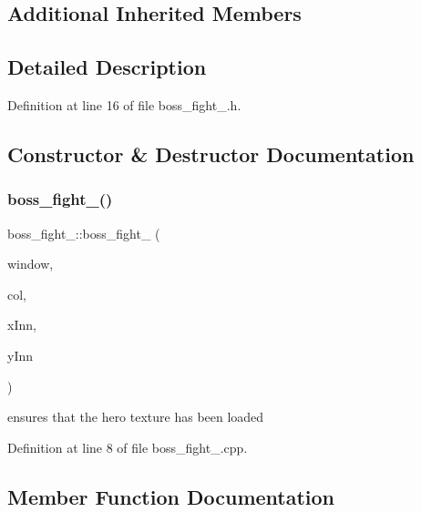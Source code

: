 \subsection*{Additional Inherited Members}


\subsection{Detailed Description}


Definition at line 16 of file boss\+\_\+fight\+\_.\+h.



\subsection{Constructor \& Destructor Documentation}
\hypertarget{classboss__fight__3_acce476f4d093dcf8266d554d5b574edf}{}\label{classboss__fight__3_acce476f4d093dcf8266d554d5b574edf} 
\subsubsection{\texorpdfstring{boss\+\_\+fight\+\_()}{boss\_fight\_3()}}
{\footnotesize\ttfamily boss\+\_\+fight\+\_\+::boss\+\_\+fight\+\_ (\begin{DoxyParamCaption}\item[{sf\+::\+Render\+Window \&}]{window,  }\item[{\hyperlink{class_collision}{Collision}}]{col,  }\item[{int}]{x\+Inn,  }\item[{int}]{y\+Inn }\end{DoxyParamCaption})}

ensures that the hero texture has been loaded 

Definition at line 8 of file boss\+\_\+fight\+\_.\+cpp.



\subsection{Member Function Documentation}
\hypertarget{classboss__fight__3_adfe8a4ff5e97513348411aa89a91e68c}{}\label{classboss__fight__3_adfe8a4ff5e97513348411aa89a91e68c} 
